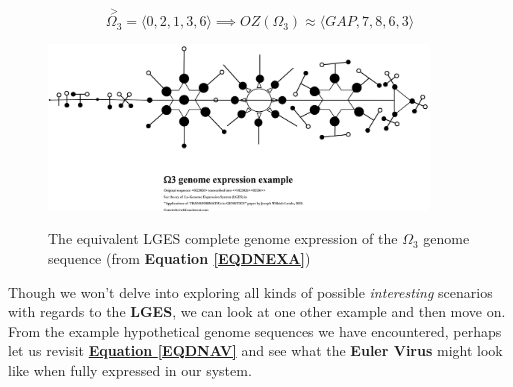\documentclass[a4paper, 18pt]{book} %
\begin{document}
\begin{equation}
\overset{>}{\Omega_{3}} = \langle 0, 2, 1, 3, 6 \rangle \implies \boxed{OZ(\Omega_{3})} \approx \langle GAP, 7, 8, 6, 3 \rangle
\end{equation}


\begin{figure}[H]
  \begin{center}
   \includegraphics[trim=0cm 0cm 0cm 0cm, clip, width=0.9\textwidth,]{resources/pdfs/PLATONIC-EXA-landscape.pdf}\\
   \caption{The equivalent LGES complete genome expression of the $\Omega_{3}$ genome sequence (from \textbf{Equation \ref{EQDNEXA}})}
  \label{FIGPLATONICEXA}
  \end{center}
\end{figure}


Though we won't delve into exploring all kinds of possible \textit{interesting} scenarios with regards to the \textbf{LGES}, we can look at one other example and then move on. From the example hypothetical genome sequences we have encountered, perhaps let us revisit \textbf{\hyperref[EQDNAV]{Equation \ref{EQDNAV}}} and see what the \textbf{Euler Virus} might look like when fully expressed in our system.
\end{document}
